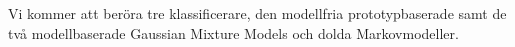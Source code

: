 \documentclass[../rapport_MVEX01-11-05]{subfiles}
\begin{document}
Vi kommer att beröra tre klassificerare, den modellfria
prototypbaserade \knn samt de två modellbaserade Gaussian Mixture
Models och dolda Markovmodeller.

%
\end{document}
